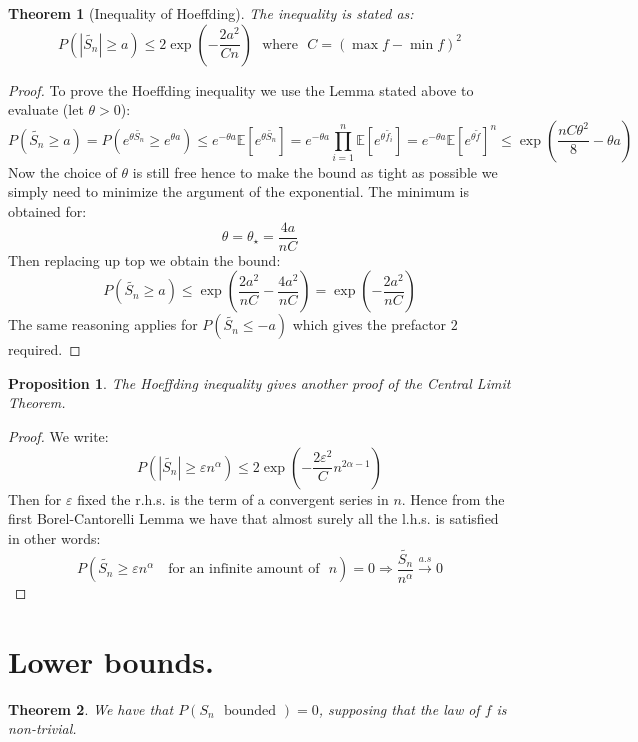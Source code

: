 \documentclass[10pt,a4paper]{book}
\newtheorem{theorem}{Theorem}[section]
\newtheorem{proposition}{Proposition}[section]
\theoremstyle{definition}
\begin{document}
\begin{theorem}[Inequality of Hoeffding]
The inequality is stated as:
\[
P(|\tilde{S_n} | \geq a) \leq 2 \exp(-\frac{2 a^2}{C n}) \mbox{~~where~~} C = (\max f - \min f)^2
\]
\end{theorem}

\begin{proof}
To prove the Hoeffding inequality we use the Lemma stated above to evaluate (let $\theta > 0$):
\[
P(\tilde{S_n} \geq a) = P(e^{\theta \tilde{S_n}} \geq e^{\theta a}) \leq e^{-\theta a} \mathbb{E}[e^{\theta \tilde{S_n}}] = e^{-\theta a} \prod_{i = 1}^n \mathbb{E}[e^{\theta \tilde{f_i}}] = e^{-\theta a} \mathbb{E}[e^{\theta \tilde{f}}]^n \leq \exp(\frac{n C \theta^2}{8} - \theta a)
\]
Now the choice of $\theta$ is still free hence to make the bound as tight as possible we simply need to minimize the argument of the exponential. The minimum is obtained for:
\[
\theta = \theta_\star = \frac{4a}{nC}
\]
Then replacing up top we obtain the bound:
\[
P(\tilde{S_n} \geq a) \leq \exp( \frac{2a^2}{nC} - \frac{4a^2}{nC}) = \exp(-\frac{2a^2}{nC})
\]
The same reasoning applies for $P(\tilde{S_n} \leq -a)$ which gives the prefactor $2$ required. 
\end{proof}

\begin{proposition}
The Hoeffding inequality gives another proof of the Central Limit Theorem.
\end{proposition}

\begin{proof}
We write:
\[
P(|\tilde{S_n}| \geq \varepsilon n^\alpha) \leq 2 \exp(-\frac{2 \varepsilon^2}{C} n^{2 \alpha - 1})
\]
Then for $\varepsilon$ fixed the r.h.s. is the term of a convergent series in $n$. Hence from the first Borel-Cantorelli Lemma we have that almost surely all the l.h.s. is satisfied in other words:
\[
P(\tilde{S_n} \geq \varepsilon n^\alpha \mbox{~~ for an infinite amount of~~} n) = 0 \Rightarrow \frac{\tilde{S_n}}{n^\alpha} \stackrel{a.s}{\longrightarrow} 0
\]
\end{proof}

\section{Lower bounds.}

\begin{theorem}
We have that $P(S_n \mbox{~~bounded~}) = 0$, supposing that the law of $f$ is non-trivial.
\end{theorem}
\end{document}
